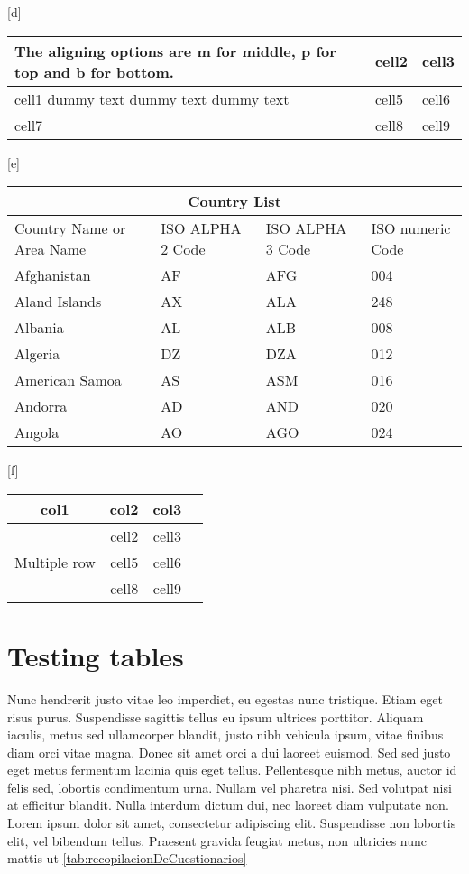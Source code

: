 \begin{center}[d]
\begin{tabular}{ | b{5cm} | m{2cm}| m{2cm} | } 
\hline
The aligning options are m for middle, p for top and b for bottom.& cell2 & cell3 \\ 
\hline
cell1 dummy text dummy text dummy text & cell5 & cell6 \\ 
\hline
cell7 & cell8 & cell9 \\ 
\hline
\end{tabular}
\end{center}

\begin{center}[e]
\begin{tabular}{ |p{3cm}||p{3cm}|p{3cm}|p{3cm}|  }
 \hline
 \multicolumn{4}{|c|}{Country List} \\
 \hline
 Country Name     or Area Name& ISO ALPHA 2 Code &ISO ALPHA 3 Code&ISO numeric Code\\
 \hline
 Afghanistan   & AF    &AFG&   004\\
 Aland Islands&   AX  & ALA   &248\\
 Albania &AL & ALB&  008\\
 Algeria    &DZ & DZA&  012\\
 American Samoa&   AS  & ASM&016\\
 Andorra& AD  & AND   &020\\
 Angola& AO  & AGO&024\\
 \hline
\end{tabular}
\end{center}


\begin{center}[f]
\begin{tabular}{ |c|c|c|c| } 
\hline
col1 & col2 & col3 \\
\hline
\multirow{3}{4em}{Multiple row} & cell2 & cell3 \\ 
& cell5 & cell6 \\ 
& cell8 & cell9 \\ 
\hline
\end{tabular}
\end{center}

\section{Testing tables}
Nunc hendrerit justo vitae leo imperdiet, eu egestas nunc tristique. Etiam eget risus purus. Suspendisse sagittis tellus eu ipsum ultrices porttitor. Aliquam iaculis, metus sed ullamcorper blandit, justo nibh vehicula ipsum, vitae finibus diam orci vitae magna. Donec sit amet orci a dui laoreet euismod. Sed sed justo eget metus fermentum lacinia quis eget tellus. Pellentesque nibh metus, auctor id felis sed, lobortis condimentum urna. Nullam vel pharetra nisi. Sed volutpat nisi at efficitur blandit. Nulla interdum dictum dui, nec laoreet diam vulputate non. Lorem ipsum dolor sit amet, consectetur adipiscing elit. Suspendisse non lobortis elit, vel bibendum tellus. Praesent gravida feugiat metus, non ultricies nunc mattis ut \ref{tab:recopilacionDeCuestionarios}


